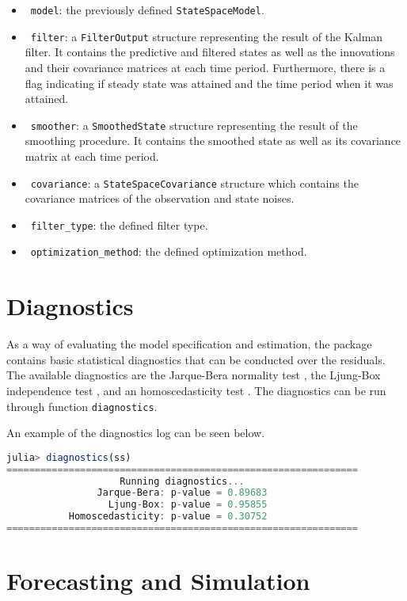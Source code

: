 \documentclass{juliacon}
\begin{document}
\begin{itemize}
    \item ~\texttt{model}: the previously defined \texttt{StateSpaceModel}.
    \item ~\texttt{filter}: a \texttt{FilterOutput} structure representing the result of the Kalman filter. It contains the predictive and filtered states as well as the innovations and their covariance matrices at each time period. Furthermore, there is a flag indicating if steady state was attained and the time period when it was attained.
    \item ~\texttt{smoother}: a \texttt{SmoothedState} structure representing the result of the smoothing procedure. It contains the smoothed state as well as its covariance matrix at each time period.
    \item ~\texttt{covariance}: a \texttt{StateSpaceCovariance} structure which contains the covariance matrices of the observation and state noises.
    \item ~\texttt{filter\_type}: the defined filter type.
    \item ~\texttt{optimization\_method}: the defined optimization method.
\end{itemize}

\section{Diagnostics} \label{sec:diagnostics}

As a way of evaluating the model specification and estimation, the package contains basic statistical diagnostics that can be conducted over the residuals. The available diagnostics are the Jarque-Bera normality test \cite{jarque1980efficient}, the Ljung-Box independence test \cite{box1970distribution}, and an homoscedasticity test \cite{durbin2012time}. The diagnostics can be run through function \texttt{diagnostics}.

An example of the diagnostics log can be seen below.
%
\begin{lstlisting}[language = Julia]
julia> diagnostics(ss)
==============================================================
                    Running diagnostics...
                Jarque-Bera: p-value = 0.89683
                  Ljung-Box: p-value = 0.95855
           Homoscedasticity: p-value = 0.30752
==============================================================
\end{lstlisting}

\section{Forecasting and Simulation} \label{sec:forecasting}
\end{document}
